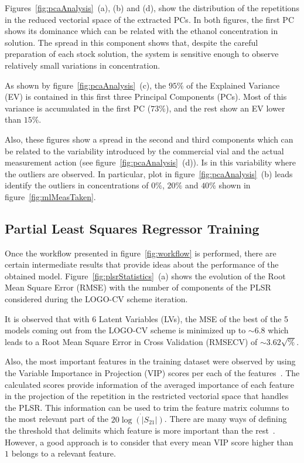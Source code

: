 \documentclass[journal,twoside,web]{ieeecolor}
\begin{document}
Figures~\ref{fig:pcaAnalysis}~(a), (b) and (d), show the distribution of the repetitions in the reduced vectorial space of the extracted PCs. In both figures, the first PC shows its dominance which can be related with the ethanol concentration in solution. The spread in this component shows that, despite the careful preparation of each stock solution, the system is sensitive enough to observe relatively small variations in concentration. 

As shown by figure~\ref{fig:pcaAnalysis}~(c), the $95\%$ of the Explained Variance (EV) is contained in this first three Principal Components (PCs). Most of this variance is accumulated in the first PC ($73\%$), and the rest show an EV lower than $15\%$. 

Also, these figures show a spread in the second and third components which can be related to the variability introduced by the commercial vial and the actual measurement action (see figure~\ref{fig:pcaAnalysis}~(d)). Is in this variability where the outliers are observed. In particular, plot in figure~\ref{fig:pcaAnalysis}~(b) leads identify the outliers in concentrations of $0\%$, $20\%$ and $40\%$ shown in figure~\ref{fig:mlMeasTaken}.   


\subsection{Partial Least Squares Regressor Training}
\label{ssec:plsRegressor}

Once the workflow presented in figure~\ref{fig:workflow} is performed, there are certain intermediate results that provide ideas about the performance of the obtained model. Figure~\ref{fig:plsrStatistics}~(a) shows the evolution of the Root Mean Square Error (RMSE) with the number of components of the PLSR considered during the LOGO-CV scheme iteration. 

It is observed that with $6$ Latent Variables (LVs), the MSE of the best of the 5 models coming out from the LOGO-CV scheme is minimized up to $\sim6.8$ which leads to a Root Mean Square Error in Cross Validation (RMSECV) of $\sim3.62\sqrt{\%}$.

Also, the most important features in the training dataset were observed by using the Variable Importance in Projection (VIP) scores per each of the features~\cite{Chong2005}. The calculated scores provide information of the averaged importance of each feature in the projection of the repetition in the restricted vectorial space that handles the PLSR. This information can be used to trim the feature matrix columns to the most relevant part of the $20\dot{\log\left(|S_{21}|\right)}$. There are many ways of defining the threshold that delimits which feature is more important than the rest~\cite{Ansari2015}. However, a good approach is to consider that every mean VIP score higher than $1$ belongs to a relevant feature. 
 
\end{document}
